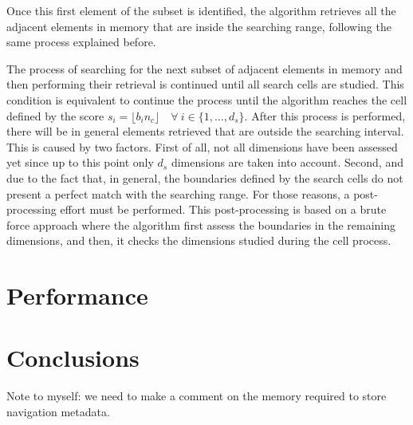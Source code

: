 \documentclass[preprint,12pt]{elsarticle}
\begin{document}
Once this first element of the subset is identified, the algorithm retrieves all the adjacent elements in memory that are inside the searching range, following the same process explained before.

The process of searching for the next subset of adjacent elements in memory and then performing their retrieval is continued until all search cells are studied. This condition is equivalent to continue the process until the algorithm reaches the cell defined by the score $s_i = \lfloor b_in_c \rfloor \quad \forall \: i\in\{1,\dots,d_s\}$. After this process is performed, there will be in general elements retrieved that are outside the searching interval. This is caused by two factors. First of all, not all dimensions have been assessed yet since up to this point only $d_s$ dimensions are taken into account. Second, and due to the fact that, in general, the boundaries defined by the search cells do not present a perfect match with the searching range. For those reasons, a post-processing effort must be performed. This post-processing is based on a brute force approach where the algorithm first assess the boundaries in the remaining dimensions, and then, it checks the dimensions studied during the cell process.


\section{Performance}
\label{sec:performance}

\section{Conclusions}
\label{sec:conclusions}

Note to myself: we need to make a comment on the memory required to store navigation metadata.
\end{document}
